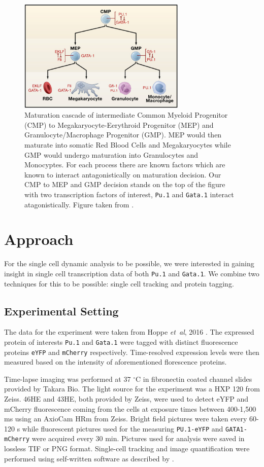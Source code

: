 \documentclass{bioinfo}
\begin{document}
\begin{figure}[h]
\includegraphics[width=8cm]{figures/homatopoietic_focus}
\caption{Maturation cascade of intermediate Common Myeloid Progenitor (CMP) to Megakaryocyte-Eerythroid Progenitor (MEP) and Granulocyte/Macrophage Progenitor (GMP). MEP would then maturate into somatic Red Blood Cells and Megakaryocytes while GMP would undergo maturation into Granulocytes and Monocyptes. For each process there are known factors which are known to interact antagonistically on maturation decision. Our CMP to MEP and GMP decision stands on the top of the figure with two transcription factors of interest, \texttt{Pu.1} and \texttt{Gata.1} interact atagonistically. Figure taken from \citealp{Graf09}.}\label{fig:01}
\end{figure}

\section{Approach}

For the single cell dynamic analysis to be possible, we were interested in gaining insight in single cell transcription data of both \texttt{Pu.1} and \texttt{Gata.1}. We combine two techniques for this to be possible: single cell tracking and protein tagging.

\subsection{Experimental Setting}

The data for the experiment were taken from Hoppe {\it et~al}, 2016 \citep{Hoppe16}. The expressed protein of interests \texttt{Pu.1} and \texttt{Gata.1} were tagged with distinct fluorescence proteins \texttt{eYFP} and \texttt{mCherry} respectively. Time-resolved expression levels were then measured based on the intensity of aforementioned florescence proteins.

Time-lapse imaging was performed at 37 $^{\circ}$C in fibronectin coated channel slides provided by Takara Bio. The light source for the experiment was a HXP 120 from Zeiss. 46HE and 43HE, both provided by Zeiss, were used to detect eYFP and mCherry fluorescence coming from the cells at exposure times between 400-1,500 ms using an AxioCam HRm from Zeiss. Bright field pictures were taken every 60-120 s while fluorescent pictures used for the measuring \texttt{PU.1-eYFP} and \texttt{GATA1-mCherry} were acquired every 30 min. Pictures used for analysis were saved in lossless TIF or PNG format. Single-cell tracking and image quantification were performed using self-written software as described by \citealp{Hoppe16}.
\end{document}
